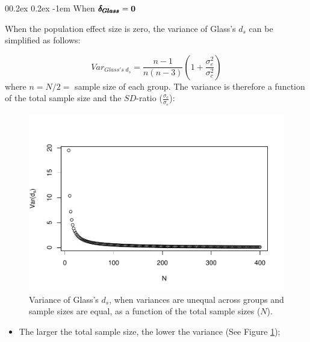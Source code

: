 \documentclass[
  english,
  man]{apa6}
\makeatletter
\providecommand{\tightlist}{%
  \setlength{\itemsep}{0pt}\setlength{\parskip}{0pt}}
\let\oldparagraph\paragraph
\renewcommand{\paragraph}[1]{\oldparagraph{#1}\mbox{}}
\renewcommand{\paragraph}{\@startsection{paragraph}{4}{\parindent}%
  {0\baselineskip \@plus 0.2ex \@minus 0.2ex}%
  {-1em}%
  {\normalfont\normalsize\bfseries\itshape\typesectitle}}
\makeatother
\begin{document}
\hypertarget{when-bf-pmbdelta_glass0-1}{%
\paragraph{\texorpdfstring{When \(\bf \pmb{\delta_{Glass}}=0\)}{When \textbackslash bf \textbackslash pmb\{\textbackslash delta\_\{Glass\}\}=0}}\label{when-bf-pmbdelta_glass0-1}}

When the population effect size is zero, the variance of Glass's \(d_s\) can be simplified as follows:

\[Var_{Glass's \; d_s} = \frac{n-1}{n(n-3)} \left( 1+\frac{\sigma^2_e}{\sigma^2_c}\right)\]
where \(n=N/2=\) sample size of each group. The variance is therefore a function of the total sample size and the \(SD\)-ratio (\(\frac{\sigma_c}{\sigma_e}\)):

\begin{figure}
\centering
\includegraphics{Theoretical-Variance-of-all-estimators-as-a-function-of-population-parameters_files/figure-latex/varglassHetbalNsize2-1.pdf}
\caption{\label{fig:varglassHetbalNsize2}Variance of Glass's \(d_s\), when variances are unequal across groups and sample sizes are equal, as a function of the total sample sizes (\(N\)).}
\end{figure}

\begin{itemize}
\tightlist
\item
  The larger the total sample size, the lower the variance (See Figure \ref{fig:varglassHetbalNsize2});
\end{itemize}
\end{document}
